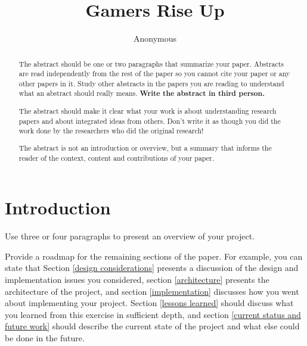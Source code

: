 \documentclass[sigconf]{acmart}
\begin{document}
\title{Gamers Rise Up}


\author{Anonymous}

\begin{abstract}
  The abstract should be one or two paragraphs that
  summarize your paper. Abstracts are read independently
  from the rest of the paper so you cannot cite your paper
  or any other papers in it. Study other abstracts in the papers
  you are reading to understand what an abstract should
  really means. {\bf Write the abstract in third person.}

 The abstract should make it clear what your work is about
  understanding research papers and about integrated ideas from
  others. Don't write it as though you did the work done by the
  researchers who did the original research! 

  The abstract is not an introduction or overview, but a summary that
  informs the reader of the context, content and contributions of your
  paper.

\end{abstract}


\maketitle


\section{Introduction}
\label{introduction}

Use three or four paragraphs to present an overview of your project.

Provide a roadmap for the remaining sections of the paper. For
example, you can state that Section \ref{design considerations}
presents a discussion of the design and implementation issues you
considered, section \ref{architecture} presents the architecture of
the project, and section \ref{implementation} discusses how you went
about implementing your project.  Section \ref{lessons learned} should
discuss what you learned from this exercise in sufficient depth, and
section \ref{current status and future work} should describe the
current state of the project and what else could be done in the
future.
\end{document}
